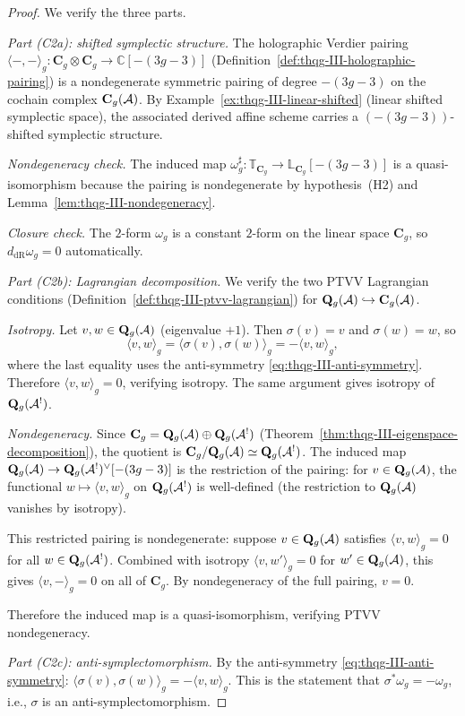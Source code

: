 \begin{proof}
We verify the three parts.

\emph{Part (C2a): shifted symplectic structure.}
The holographic Verdier pairing
$\langle -, - \rangle_g \colon
\mathbf{C}_g \otimes \mathbf{C}_g \to \mathbb{C}[{-(3g{-}3)}]$
(Definition~\ref{def:thqg-III-holographic-pairing}) is a
nondegenerate symmetric pairing of degree $-(3g-3)$ on the
cochain complex $\mathbf{C}_g(\mathcal{A})$. By
Example~\ref{ex:thqg-III-linear-shifted} (linear shifted
symplectic space), the associated derived affine scheme
carries a $(-(3g-3))$-shifted symplectic structure.

\emph{Nondegeneracy check.}
The induced map $\omega_g^{\sharp} \colon
\mathbb{T}_{\mathbf{C}_g} \to \mathbb{L}_{\mathbf{C}_g}[-(3g-3)]$
is a quasi-isomorphism because the pairing is nondegenerate
by hypothesis~(H2) and
Lemma~\ref{lem:thqg-III-nondegeneracy}.

\emph{Closure check.}
The $2$-form $\omega_g$ is a constant $2$-form on the linear
space $\mathbf{C}_g$, so $d_{\mathrm{dR}} \omega_g = 0$
automatically.

\emph{Part (C2b): Lagrangian decomposition.}
We verify the two PTVV Lagrangian conditions
(Definition~\ref{def:thqg-III-ptvv-lagrangian}) for
$\mathbf{Q}_g(\mathcal{A}) \hookrightarrow \mathbf{C}_g(\mathcal{A})$.

\emph{Isotropy.}
Let $v, w \in \mathbf{Q}_g(\mathcal{A})$ (eigenvalue $+1$). Then
$\sigma(v) = v$ and $\sigma(w) = w$, so
\[
\langle v, w \rangle_g
= \langle \sigma(v), \sigma(w) \rangle_g
= -\langle v, w \rangle_g,
\]
where the last equality uses the anti-symmetry
\eqref{eq:thqg-III-anti-symmetry}. Therefore
$\langle v, w \rangle_g = 0$, verifying isotropy.
The same argument gives isotropy of $\mathbf{Q}_g(\mathcal{A}^!)$.

\emph{Nondegeneracy.}
Since $\mathbf{C}_g = \mathbf{Q}_g(\mathcal{A}) \oplus
\mathbf{Q}_g(\mathcal{A}^!)$
(Theorem~\ref{thm:thqg-III-eigenspace-decomposition}), the
quotient is
$\mathbf{C}_g / \mathbf{Q}_g(\mathcal{A}) \simeq \mathbf{Q}_g(\mathcal{A}^!)$.
The induced map
$\mathbf{Q}_g(\mathcal{A}) \to \mathbf{Q}_g(\mathcal{A}^!)^{\vee}[-(3g-3)]$
is the restriction of the pairing:
for $v \in \mathbf{Q}_g(\mathcal{A})$, the functional
$w \mapsto \langle v, w \rangle_g$ on
$\mathbf{Q}_g(\mathcal{A}^!)$ is well-defined (the restriction to
$\mathbf{Q}_g(\mathcal{A})$ vanishes by isotropy).

This restricted pairing is nondegenerate: suppose
$v \in \mathbf{Q}_g(\mathcal{A})$ satisfies
$\langle v, w \rangle_g = 0$ for all
$w \in \mathbf{Q}_g(\mathcal{A}^!)$. Combined with isotropy
$\langle v, w' \rangle_g = 0$ for
$w' \in \mathbf{Q}_g(\mathcal{A})$, this gives
$\langle v, - \rangle_g = 0$ on all of $\mathbf{C}_g$.
By nondegeneracy of the full pairing, $v = 0$.

Therefore the induced map is a quasi-isomorphism, verifying
PTVV nondegeneracy.

\emph{Part (C2c): anti-symplectomorphism.}
By the anti-symmetry \eqref{eq:thqg-III-anti-symmetry}:
$\langle \sigma(v), \sigma(w) \rangle_g
= -\langle v, w \rangle_g$.
This is the statement that
$\sigma^* \omega_g = -\omega_g$, i.e., $\sigma$ is an
anti-symplectomorphism.
\end{proof}

